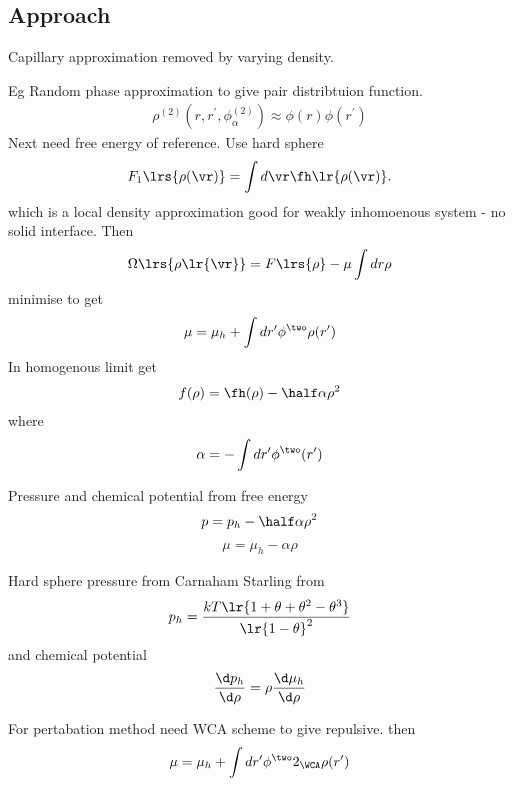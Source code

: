 {\subsection{Approach}
Capillary approximation removed by varying density.

Eg Random phase approximation to give pair distribtuion function\cite{Ruckensteirn2005}.
\begin{align}
\rho^{(2)} (r, r^\prime, \phi_\alpha^{(2)}) \approx \phi(r) \phi(r^\prime)
\end{align}
Next need free energy of reference.
Use hard sphere\cite{Ruckensteirn2005}
\begin{align}
F_1\lrs{\rho(\vr)} = \int d\vr \fh \lr{\rho(\vr)}.
\end{align}
which is a local density approximation good for weakly inhomoenous system - no solid interface\cite{Ruckensteirn2005}.
Then 
\begin{align}
  \Omega\lrs{\rho\lr{\vr}} = F\lrs{\rho} - \mu \int dr \rho
\end{align}
minimise to get\cite{Ruckensteirn2005}
\begin{align}
  \mu = \mu_h + \int dr^\prime \phi^\two \rho(r^\prime)
\end{align}
In homogenous limit get \cite{Ruckensteirn2005}
\begin{align}
  f(\rho) = \fh(\rho) - \half \alpha \rho^2
\end{align}
where \cite{Ruckensteirn2005}
\begin{align}
  \alpha = -\int dr^\prime \phi^\two(r^\prime)
\end{align}

Pressure and chemical potential from free energy\cite{Ruckensteirn2005}
\begin{align}
  p = p_h - \half \alpha \rho^2
\end{align}
\begin{align}
  \mu = \mu_h - \alpha \rho
\end{align}

Hard sphere pressure from Carnaham Starling from\cite{Ruckensteirn2005}
\begin{align}
  p_h = \frac{kT\lr{1 + \theta + \theta^2 - \theta^3}}{\lr{1 - \theta}^2}
\end{align}
and chemical potential \cite{Ruckensteirn2005}
\begin{align}
  \frac{\d p_h}{\d \rho} = \rho \frac{\d \mu_h}{\d \rho}
\end{align}

For pertabation method need  WCA scheme\cite{Ruckensteirn2005}
to give repulsive.
then
\begin{align}
  \mu = \mu_h + \int dr^\prime \phi^\two2_\WCA \rho(r^\prime)
\end{align}

}
